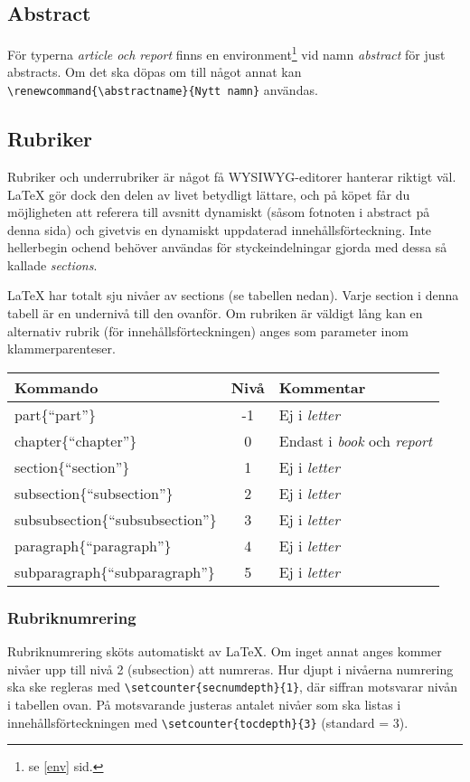 \subsection{Abstract}
För typerna \emph{article \em och \em report} finns en environment\footnote{se \ref{env} sid. \pageref{env}} vid namn \emph{abstract} för just abstracts. Om det ska döpas om till något annat kan \verb?\renewcommand{\abstractname}{Nytt namn}? användas.

\subsection{Rubriker}\label{sec:sections}
Rubriker och underrubriker är något få WYSIWYG-editorer hanterar riktigt väl. \LaTeX{} gör dock den delen av livet betydligt lättare, och på köpet får du möjligheten att referera till avsnitt dynamiskt (såsom fotnoten i abstract på denna sida) och givetvis en dynamiskt uppdaterad innehållsförteckning. Inte heller\tb{}begin och\tb{}end behöver användas för styckeindelningar gjorda med dessa så kallade \emph{sections}.

\LaTeX{} har totalt sju nivåer av sections (se tabellen nedan). Varje section i denna tabell är en undernivå till den ovanför. Om rubriken är väldigt lång kan en alternativ rubrik (för innehållsförteckningen) anges som parameter inom klammerparenteser.

{\center
\begin{tabular}{|l|c|p{9cm}|}
  \hline
  Kommando & Nivå & Kommentar\\
  \hline\tb{}part\{``part''\}                   & -1 & Ej i \emph{letter}\\\hline
  \tb{}chapter\{``chapter''\}                   & 0 & Endast i \emph{book} och \emph{report}\\\hline
  \tb{}section\{``section''\}                   & 1 & Ej i \emph{letter}\\\hline
  \tb{}subsection\{``subsection''\}             & 2 & Ej i \emph{letter}\\\hline
  \tb{}subsubsection\{``subsubsection''\}       & 3 & Ej i \emph{letter}\\\hline
  \tb{}paragraph\{``paragraph''\}               & 4 & Ej i \emph{letter}\\\hline
  \tb{}subparagraph\{``subparagraph''\}         & 5 & Ej i \emph{letter}\\\hline
\end{tabular}}

\subsubsection{Rubriknumrering}
Rubriknumrering sköts automatiskt av \LaTeX. Om inget annat anges kommer nivåer upp till nivå 2 (subsection) att numreras. Hur djupt i nivåerna numrering ska ske regleras med \verb?\setcounter{secnumdepth}{1}?, där siffran motsvarar nivån i tabellen ovan. På motsvarande justeras antalet nivåer som ska listas i innehållsförteckningen med \verb?\setcounter{tocdepth}{3}? (standard = 3).

